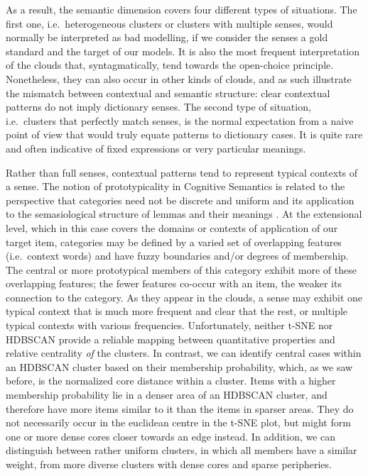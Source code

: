 \documentclass[
]{book}
\begin{document}
As a result, the semantic dimension covers four different types of situations. The first one, i.e.~heterogeneous clusters or clusters with multiple senses, would normally be interpreted as bad modelling, if we consider the senses a gold standard and the target of our models. It is also the most frequent interpretation of the clouds that, syntagmatically, tend towards the open-choice principle. Nonetheless, they can also occur in other kinds of clouds, and as such illustrate the mismatch between contextual and semantic structure: clear contextual patterns do not imply dictionary senses.
The second type of situation, i.e.~clusters that perfectly match senses, is the normal expectation from a naive point of view that would truly equate patterns to dictionary cases. It is quite rare and often indicative of fixed expressions or very particular meanings.

Rather than full senses, contextual patterns tend to represent typical contexts of a sense.
The notion of prototypicality in Cognitive Semantics is related to the perspective that categories need not be discrete and uniform and its application to the semasiological structure of lemmas and their meanings \autocite{geeraerts_1988}. At the extensional level, which in this case covers the domains or contexts of application of our target item, categories may be defined by a varied set of overlapping features (i.e.~context words) and have fuzzy boundaries and/or degrees of membership. The central or more prototypical members of this category exhibit more of these overlapping features; the fewer features co-occur with an item, the weaker its connection to the category.
As they appear in the clouds, a sense may exhibit one typical context that is much more frequent and clear that the rest, or multiple typical contexts with various frequencies. Unfortunately, neither t-SNE nor HDBSCAN provide a reliable mapping between quantitative properties and relative centrality \emph{of} the clusters. In contrast, we can identify central cases within an HDBSCAN cluster based on their membership probability, which, as we saw before, is the normalized core distance within a cluster. Items with a higher membership probability lie in a denser area of an HDBSCAN cluster, and therefore have more items similar to it than the items in sparser areas. They do not necessarily occur in the euclidean centre in the t-SNE plot, but might form one or more dense cores closer towards an edge instead. In addition, we can distinguish between rather uniform clusters, in which all members have a similar weight, from more diverse clusters with dense cores and sparse peripheries.
\end{document}
